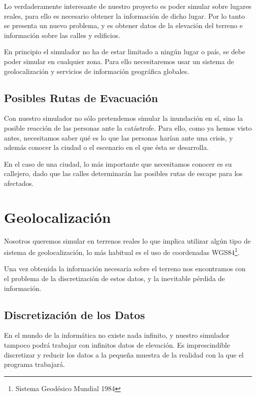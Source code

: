 Lo verdaderamente interesante de nuestro proyecto es poder simular sobre
lugares reales, para ello es necesario obtener la información de dicho lugar.
Por lo tanto se presenta un nuevo problema, y es obtener datos de la elevación
del terreno e información sobre las calles y edificios.

En principio el simulador no ha de estar limitado a ningún lugar o país, se
debe poder simular en cualquier zona. Para ello necesitaremos usar un sistema de
geolocalización y servicios de información geográfica globales.

\subsection*{Posibles Rutas de Evacuación}

Con nuestro simulador no sólo pretendemos simular la inundación en sí, sino la
posible reacción de las personas ante la catástrofe. Para ello, como ya hemos
visto antes, necesitamos saber qué es lo que las personas harían ante una
crisis, y además conocer la ciudad o el escenario en el que ésta se desarrolla.

En el caso de una ciudad, lo más importante que necesitamos conocer es su
callejero, dado que las calles determinarán las posibles rutas de escape para
los afectados.

\section*{Geolocalización}

Nosotros queremos simular en terrenos reales lo que implica utilizar algún tipo
de sistema de geolocalización, lo más habitual es el uso de coordenadas
WGS84\footnote{Sistema Geodésico Mundial 1984}.

Una vez obtenida la información necesaria sobre el terreno nos encontramos con
el problema de la discretización de estos datos, y la inevitable pérdida de
información.

\subsection*{Discretización de los Datos}

En el mundo de la informática no existe nada infinito, y nuestro simulador
tampoco podrá trabajar con infinitos datos de elevación. Es imprescindible
discretizar y reducir los datos a la pequeña muestra de la realidad con la que
el programa trabajará.

